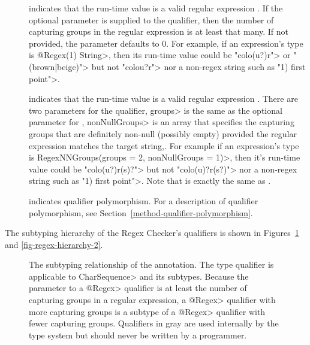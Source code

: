 \begin{description}

\item[]
  indicates that the run-time value is a valid regular expression
  .  If the optional parameter is supplied to the qualifier,
  then the number of capturing groups in the regular expression is at least
  that many. If not provided, the parameter defaults to 0.
  For example, if an expression's type is \<@Regex(1) String>, then its
  run-time value could be \<"colo(u?)r"> or \<"(brown|beige)"> but not
  \<"colou?r"> nor a non-regex string such as \<"1) first point">.

\item[]
  indicates that the run-time value is a valid regular expression
  . There are two parameters for the qualifier, \<groups>
  is the same as the optional parameter for , \<nonNullGroups>
  is an array that specifies the capturing groups that are definitely
  non-null (possibly empty) provided the regular expression matches the
  target string,. For example if an expression's type is
  \<RegexNNGroups(groups = 2, nonNullGroups = {1})>, then it's run-time
  value could be \<"colo(u?)r(s)?"> but not \<"colo(u)?r(s?)"> nor a
  non-regex string such as \<"1) first point">. Note that 
  is exactly the same as .

\item[]
  indicates qualifier polymorphism.
  For a description of qualifier polymorphism, see
  Section~\ref{method-qualifier-polymorphism}.

\end{description}

The subtyping hierarchy of the Regex Checker's qualifiers is shown in
Figures~\ref{fig-regex-hierarchy-1} and \ref{fig-regex-hierarchy-2}.

\begin{figure}
\caption{The subtyping relationship of the  annotation.
  The type qualifier is applicable to \<CharSequence> and its subtypes.
  Because the parameter to a \<@Regex> qualifier is at least the number of
  capturing groups in a regular expression, a \<@Regex> qualifier with more
  capturing groups is a subtype of a \<@Regex> qualifier with fewer capturing
  groups. Qualifiers in gray are used internally by the type
  system but should never be written by a programmer.}
\label{fig-regex-hierarchy-1}
\end{figure}

